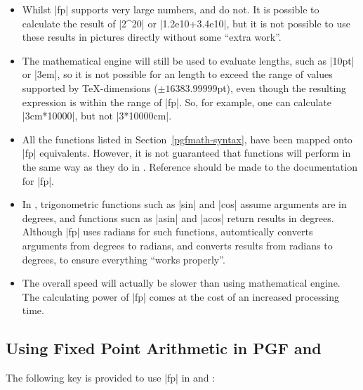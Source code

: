 \begin{itemize}
	
  \item 
  
  Whilst |fp| supports very large numbers, \pgfname{} and
  \tikzname{} do not. It is possible to calculate the result of 
  |2^20| or |1.2e10+3.4e10|, but it is not possible to use these
  results in pictures directly without some ``extra work''.
  
  \item
  
  The \pgfname{} mathematical engine will still be used to evaluate
  lengths, such as |10pt| or |3em|, so it is not possible for an
  length to exceed the range of values supported by 
  \TeX-dimensions ($\pm16383.99999$pt), even though the resulting 
  expression is within the range of |fp|. So, for example, one can
  calculate |3cm*10000|, but not |3*10000cm|.
  
  \item
  
  All the functions listed in Section~\ref{pgfmath-syntax}, have been
  mapped onto |fp| equivalents. However, it is not guaranteed that
  functions will perform in the same way as they do 
  in \pgfname. Reference should be made to the documentation for |fp|.
  
  \item
  
  In \pgfname, trigonometric functions such as |sin| and |cos| assume 
  arguments are in degrees, and functions sucn as |asin| and |acos|
  return results in degrees. Although |fp| uses radians for such
  functions, \pgfname{} automtically converts arguments from degrees 
  to radians, and converts results from radians to degrees, to ensure 
  everything ``works properly''.
   
  \item
  
  The overall speed will actually be slower than using 
  \pgfname{} mathematical engine. The calculating power of |fp| 
  comes at the cost of an increased processing time.
  
  
\end{itemize}
  
\subsection{Using Fixed Point Arithmetic in PGF and \tikzname}

  The following key is provided to use |fp| in \pgfname{} 
  and \tikzname:
  
